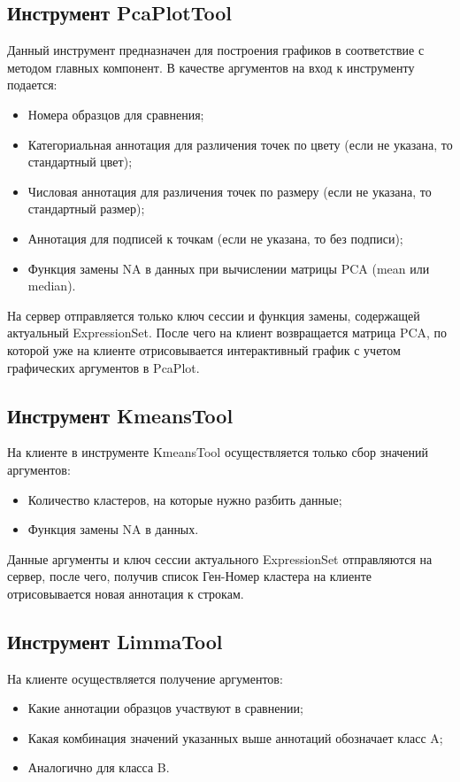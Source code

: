 \documentclass[annotation,specification]{itmo-student-thesis}
\begin{document}
\subsection{Инструмент PcaPlotTool}
Данный инструмент предназначен для построения графиков в соответствие с методом главных компонент.
В качестве аргументов на вход к инструменту подается:
\begin{itemize}
\item Номера образцов для сравнения;
\item Категориальная аннотация для различения точек по цвету (если не указана, то стандартный цвет);
\item Числовая аннотация для различения точек по размеру (если не указана, то стандартный размер);
\item Аннотация для подписей к точкам (если не указана, то без подписи);
\item Функция замены NA в данных при вычислении матрицы PCA (mean или median).
\end{itemize}

На сервер отправляется только ключ сессии и функция замены, содержащей актуальный ExpressionSet. После чего на клиент возвращается матрица PCA, по которой уже на клиенте отрисовывается интерактивный график с учетом графических аргументов в PcaPlot.

\subsection{Инструмент KmeansTool}
На клиенте в инструменте KmeansTool осуществляется только сбор значений аргументов:
\begin{itemize}
\item Количество кластеров, на которые нужно разбить данные;
\item Функция замены NA в данных.
\end{itemize}

Данные аргументы и ключ сессии актуального ExpressionSet отправляются на сервер, после чего, получив список Ген-Номер кластера на клиенте отрисовывается новая аннотация к строкам.

\subsection{Инструмент LimmaTool}
На клиенте осуществляется получение аргументов:
\begin{itemize}
\item Какие аннотации образцов участвуют в сравнении;
\item Какая комбинация значений указанных выше аннотаций обозначает класс A;
\item Аналогично для класса B.
\end{itemize}
\end{document}
